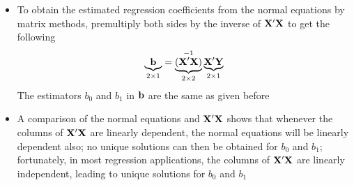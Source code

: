 \begin{itemize}
\item To obtain the estimated regression coefficients from the normal equations by matrix methods, premultiply both sides by the inverse of $\mathbf{X}'\mathbf{X}$ to get the following 
$$ \underbrace{\mathbf{b}}_{2 \times 1} = \underbrace{(\mathbf{X}'\mathbf{X})}_{2 \times 2}^{-1} \underbrace{\mathbf{X}'\mathbf{Y}}_{2 \times 1} $$ 
The estimators $b_0$ and $b_1$ in $\mathbf{b}$ are the same as given before
\item A comparison of the normal equations and $\mathbf{X}'\mathbf{X}$ shows that whenever the columns of $\mathbf{X}'\mathbf{X}$ are linearly dependent, the normal equations will be linearly dependent also; no unique solutions can then be obtained for $b_0$ and $b_1$; fortunately, in most regression applications, the columns of $\mathbf{X}'\mathbf{X}$ are linearly independent, leading to unique solutions for $b_0$ and $b_1$ 
\end{itemize}

